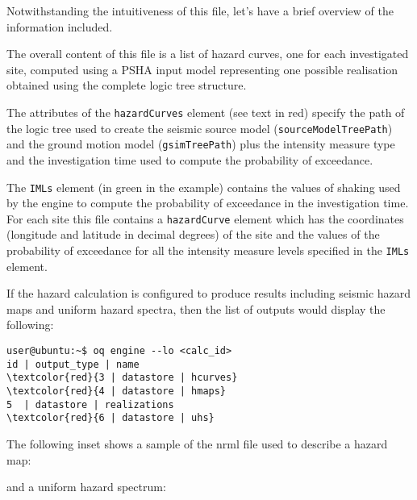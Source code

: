 

Notwithstanding the intuitiveness of this file, let's have a brief
overview of the information included.

The overall content of this file is a list of hazard curves, one for each
investigated site, computed using a PSHA input model representing one possible
realisation obtained using the complete logic tree structure.

The attributes of the \texttt{hazardCurves} element (see text in red) specify
the path of the logic tree used to create the seismic source model
(\texttt{source\-Model\-TreePath}) and the ground motion model
(\texttt{gsim\-Tree\-Path}) plus the intensity measure type and the
investigation time used to compute the probability of exceedance.

The \texttt{IMLs} element (in green in the example) contains the values of
shaking used by the engine to compute the probability of exceedance in the
investigation time. For each site this file contains a \texttt{hazardCurve}
element which has the coordinates (longitude and latitude in decimal degrees)
of the site and the values of the probability of exceedance for all the
intensity measure levels specified in the \texttt{IMLs} element.

If the hazard calculation is configured to produce results including seismic hazard maps and uniform hazard spectra, then the list of outputs would display the following:

\begin{Verbatim}[frame=single, commandchars=\\\{\}, fontsize=\small]
user@ubuntu:~$ oq engine --lo <calc_id>
id | output_type | name
\textcolor{red}{3 | datastore | hcurves}
\textcolor{red}{4 | datastore | hmaps}
5  | datastore | realizations
\textcolor{red}{6 | datastore | uhs}
\end{Verbatim}

%


The following inset shows a sample of the nrml file used to describe a hazard map:



\noindent and a uniform hazard spectrum:

